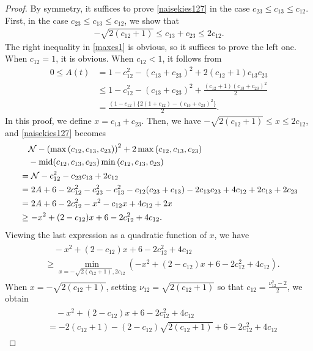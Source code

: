 \documentclass[reqno]{amsart}
\theoremstyle{plain}
\theoremstyle{definition}
\numberwithin{equation}{section}
\newcommand{\m}{\mbox{\textnormal{mid}}}
\newcommand{\1}{\mathbbm{1}}
\begin{document}
\begin{proof}
By symmetry, it suffices to prove \eqref{naisekies127} in the case $c_{23}\leq c_{13}\leq c_{12}$.
First, in the case $c_{23}\leq c_{13}\leq c_{12}$, we show that
\begin{align}\label{maxes1}
-\sqrt{2(c_{12}+1)}\leq c_{13}+c_{23}\leq 2c_{12}.
\end{align}
The right inequality in \eqref{maxes1} is obvious, so it suffices to prove the left one.
When $c_{12}=1$, it is obvious. When $c_{12}<1$, it follows from
\begin{align*}
0\leq A(t)&=1-c_{12}^2-(c_{13}+c_{23})^2+2(c_{12}+1)c_{13}c_{23}
\\
&\leq 1-c_{12}^2-(c_{13}+c_{23})^2+\frac{(c_{12}+1)(c_{13}+c_{23})^2}{2}
\\
&=\frac{(1-c_{12})\{2(1+c_{12})-(c_{13}+c_{23})^2\}}{2}.
\end{align*}
In this proof, we define $x=c_{13}+c_{23}$. Then, we have $-\sqrt{2(c_{12}+1)}\leq x\leq 2c_{12}$, and \eqref{naisekies127} becomes
\begin{align*}
&\quad \mathcal{N}-\left(\max{(c_{12},c_{13},c_{23})}\right)^2+2\max{(c_{12},c_{13},c_{23})}
\\
&\quad-\m{(c_{12},c_{13},c_{23})}\min{(c_{12},c_{13},c_{23})}
\\
&=\mathcal{N}-c_{12}^2-c_{23}c_{13}+2c_{12}
\\
&=2A+6-2c_{12}^2-c_{23}^2-c_{13}^2-c_{12}(c_{23}+c_{13})-2c_{13}c_{23}+4c_{12}+2c_{13}+2c_{23}
\\
&=2A+6-2c_{12}^2-x^2-c_{12}x+4c_{12}+2x
\\
&\geq -x^2+(2-c_{12})x+6-2c_{12}^2+4c_{12}.
\end{align*}
Viewing the last expression as a quadratic function of $x$, we have
\begin{align}\label{nijikansuuimines0}
\begin{aligned}
&\quad  -x^2+(2-c_{12})x+6-2c_{12}^2+4c_{12}
\\
&\geq \min_{x=-\sqrt{2(c_{12}+1)},2c_{12}}\left(-x^2+(2-c_{12})x+6-2c_{12}^2+4c_{12}\right).
\end{aligned}
 \end{align}
When $x=-\sqrt{2(c_{12}+1)}$, setting $\nu_{12}=\sqrt{2(c_{12}+1)}$ so that $c_{12}=\frac{\nu_{12}^2-2}{2}$, we obtain
 \begin{align}\label{chyouka0213}
 \begin{aligned}
&\quad -x^2+(2-c_{12})x+6-2c_{12}^2+4c_{12}
 \\
 &= -2(c_{12}+1)-(2-c_{12})\sqrt{2(c_{12}+1)}+6-2c_{12}^2+4c_{12}

\end{aligned}
\end{align}
\end{proof}
\end{document}

